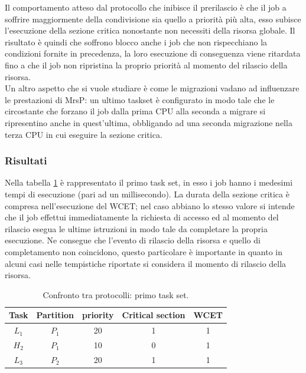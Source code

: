 \noindent Il comportamento atteso dal protocollo che inibisce il prerilascio è che il job a soffrire maggiormente della condivisione sia quello a priorità più alta, esso subisce l'esecuzione della sezione critica nonostante non necessiti della risorsa globale. Il risultato è quindi che soffrono blocco anche i job che non rispecchiano la condizioni fornite in precedenza, la loro esecuzione di conseguenza viene ritardata fino a che il job non ripristina la proprio priorità al momento del rilascio della risorsa.\\

\noindent Un altro aspetto che si vuole studiare è come le migrazioni vadano ad influenzare le prestazioni di MrsP: un ultimo taskset è configurato in modo tale che le circostante che forzano il job dalla prima CPU alla seconda a migrare si ripresentino anche in quest'ultima, obbligando ad una seconda migrazione nella terza CPU in cui eseguire la sezione critica.

\subsubsection{Risultati}
\label{sec:confronto_protocolli_ris}

Nella tabella \ref{tab:test_protocols_Taskset1} è rappresentato il primo task set, in esso i job hanno i medesimi tempi di esecuzione (pari ad un millisecondo). La durata della sezione critica è compresa nell'esecuzione del WCET; nel caso abbiano lo stesso valore si intende che il job effettui immediatamente la richiesta di accesso ed al momento del rilascio esegua le ultime istruzioni in modo tale da completare la propria esecuzione. Ne consegue che l'evento di rilascio della risorsa e quello di completamento non coincidono, questo particolare è importante in quanto in alcuni casi nelle tempistiche riportate si considera il momento di rilascio della risorsa.\\

\begin{table}
  \centering
  \begin{tabular}{ccccc}
	\hline\hline
	    Task & Partition & priority & Critical section & WCET  \\ \hline
	    $L_1$ & $P_1$  & 20 & 1 & 1 \\
	    $H_2$ & $P_1$  & 10 & 0 & 1 \\
    	$L_3$ & $P_2$  & 20 & 1 & 1 \\
  	\hline
  	\end{tabular}
  \caption{Confronto tra protocolli: primo task set.}
  \label{tab:test_protocols_Taskset1}
\end{table}


